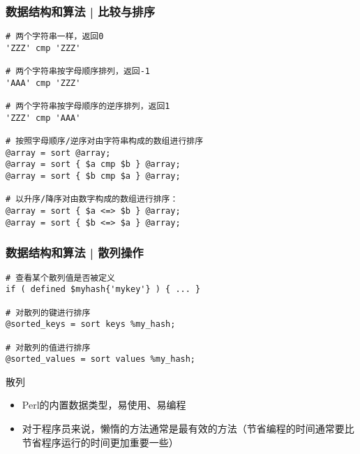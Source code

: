 \begin{frame}[fragile]
  \frametitle{数据结构和算法 | \alert{比较与排序}}
\begin{lstlisting}[basicstyle=\small\tt]
# 两个字符串一样，返回0
'ZZZ' cmp 'ZZZ'

# 两个字符串按字母顺序排列，返回-1
'AAA' cmp 'ZZZ'

# 两个字符串按字母顺序的逆序排列，返回1
'ZZZ' cmp 'AAA'

# 按照字母顺序/逆序对由字符串构成的数组进行排序
@array = sort @array;
@array = sort { $a cmp $b } @array;
@array = sort { $b cmp $a } @array;

# 以升序/降序对由数字构成的数组进行排序：
@array = sort { $a <=> $b } @array;
@array = sort { $b <=> $a } @array;
\end{lstlisting}
\end{frame}

\begin{frame}[fragile]
  \frametitle{数据结构和算法 | \alert{散列操作}}
\begin{lstlisting}
# 查看某个散列值是否被定义
if ( defined $myhash{'mykey'} ) { ... }

# 对散列的键进行排序
@sorted_keys = sort keys %my_hash;

# 对散列的值进行排序
@sorted_values = sort values %my_hash;
\end{lstlisting}
\pause
\begin{block}{散列}
  \begin{itemize}
    \item Perl的内置数据类型，易使用、易编程
    \item 对于程序员来说，懒惰的方法通常是最有效的方法（节省编程的时间通常要比节省程序运行的时间更加重要一些）
  \end{itemize}
\end{block}
\end{frame}

